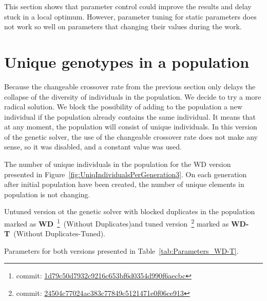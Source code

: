 This section shows that parameter control could improve the results and delay stuck in a local optimum. However, parameter tuning for static parameters does not work so well on parameters that changing their values during the work.                     

\section{Unique genotypes in a population}
\label{sec:WD}

Because the changeable crossover rate from the previous section only delays the collapse of the diversity of individuals in the population. We decide to try a more radical solution. We block the possibility of adding to the population a new individual if the population already contains the same individual. It means that at any moment, the population will consist of unique individuals. In this version of the genetic solver, the use of the changeable crossover rate does not make any sense, so it was disabled, and a constant value was used.

The number of unique individuals in the population for the WD version presented in Figure~\ref{fig:UniqIndividualsPerGeneration3}. On each generation after initial population have been created, the number of unique elements in population is not changing.

Untuned version ot the genetic solver with blocked duplicates in the population marked as  \textbf{WD}~\footnote{commit: \href{https://git-st.inf.tu-dresden.de/mquat/mquat2/commit/1d79c50d7932c9216c653bf6d0354d990f6aecbc}{1d79c50d7932c9216c653bf6d0354d990f6aecbc}}~(Without Duplicates)and tuned version~\footnote{commit: \href{https://git-st.inf.tu-dresden.de/mquat/mquat2/commit/24504c77024ac383c77849c5121471e0f06ce913}{24504c77024ac383c77849c5121471e0f06ce913}} marked as \textbf{WD-T}~(Without Duplicates-Tuned).

Parameters for both versions presented in Table~\ref{tab:Parameters_WD-T}.


